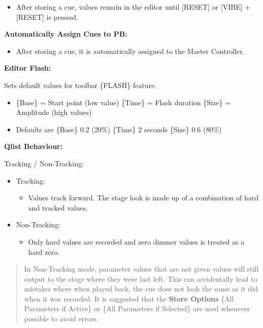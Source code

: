 \documentclass[
]{article}
\providecommand{\tightlist}{%
  \setlength{\itemsep}{0pt}\setlength{\parskip}{0pt}}
\begin{document}
\begin{itemize}
\tightlist
\item
  After storing a cue, values remain in the editor until {[}RESET{]} or {[}VIBE{]} + {[}RESET{]} is pressed.
\end{itemize}

\textbf{Automatically Assign Cues to PB:}

\begin{itemize}
\tightlist
\item
  After storing a cue, it is automatically assigned to the Master Controller.
\end{itemize}

\textbf{Editor Flash:}

Sets default values for toolbar \{FLASH\} feature.

\begin{itemize}
\item
  \{Base\} = Start point (low value) \{Time\} = Flash duration \{Size\} = Amplitude (high values)
\item
  Defaults are \{Base\} 0.2 (20\%) \{Time\} 2 seconds \{Size\} 0.6 (80\%)
\end{itemize}

\textbf{Qlist Behaviour:}

Tracking / Non-Tracking:

\begin{itemize}
\item
  Tracking:

  \begin{itemize}
  \tightlist
  \item
    Values track forward. The stage look is made up of a combination of hard and tracked values.
  \end{itemize}
\item
  Non-Tracking:

  \begin{itemize}
  \tightlist
  \item
    Only hard values are recorded and zero dimmer values is treated as a hard zero.
  \end{itemize}
\end{itemize}

\begin{quote}
{In Non-Tracking mode, parameter values that are not given values will still output to the stage where they were last left. This can accidentally lead to mistakes where when played back, the cue does not look the same as it did when it was recorded. It is suggested that the \textbf{Store Options} \{All Parameters if Active\} or \{All Parameters if Selected\} are used whenever possible to avoid errors.}
\end{quote}
\end{document}
